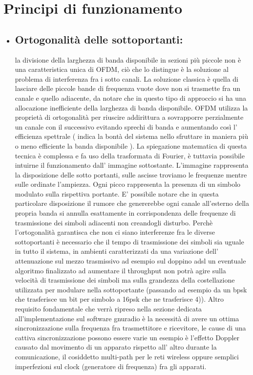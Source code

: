 \label{sec:problem}
\section{Principi di funzionamento}
\begin{itemize}
	 \item \subsection{Ortogonalità delle sottoportanti: } la divisione della larghezza di banda disponibile in sezioni più piccole non è una caratteristica unica di OFDM, ciò che lo distingue è la soluzione al problema di interferenza fra i sotto canali. La soluzione classica è quella di lasciare delle piccole bande di frequenza vuote dove non si trasmette fra un canale e quello adiacente, da notare che in questo tipo di approccio si ha una allocazione inefficiente della larghezza di banda disponibile. OFDM utilizza la proprietà di ortogonalità per riuscire addirittura a sovrapporre perzialmente un canale con il successivo evitando sprechi di banda e aumentando così l' efficienza spettrale ( indica la bontà del sistema nello sfruttare in maniera più o meno efficiente la banda disponibile \cite{efficienzaSpettrale}).
	 La spiegazione matematica di questa tecnica è complessa e fa uso della trasformata di Fourier, è tuttavia possibile intuirne il funzionamento dall' immagine sottostante. L'immagine rappresenta la disposizione delle sotto portanti, sulle ascisse troviamo le frequenze mentre sulle ordinate l'ampiezza. Ogni picco rappresenta la presenza di un simbolo modulato sulla rispettiva portante. E' possibile notare che in questa particolare disposizione il rumore che genererebbe ogni canale all'esterno della propria banda si annulla esattamente in corrispondenza delle frequenze di trasmissione dei simboli adiacenti non creandogli disturbo. Perchè l'ortogonalità garantisca che non ci siano interferenze fra le diverse sottoportanti è necessario che il tempo di trasmissione dei simboli sia uguale in tutto il sistema, in ambienti caratterizzati da una variazione dell' attenuazione sul mezzo trasmissivo ad esempio sul doppino adsl un eventuale algoritmo finalizzato ad aumentare il throughput non potrà agire sulla velocità di trasmissione dei simboli ma sulla grandezza della costellazione utilizzata per modulare nella sottoportante (passando ad esempio da un bpsk che trasferisce un bit per simbolo a 16psk che ne trasferisce 4)). Altro requisito fondamentale che verrà ripreso nella sezione dedicata all'implementazione sul software gnuradio è la necessità di avere un ottima sincronizzazione sulla frequenza fra trasmettitore e ricevitore, le cause di una cattiva sincronizzazione possono essere varie un esempio è l'effetto Doppler causato dal movimento di un apparato rispetto all' altro durante la comunicazione, il cosiddetto multi-path per le reti wireless oppure semplici imperfezioni sul clock (generatore di frequenza) fra gli apparati.

\end{itemize}
